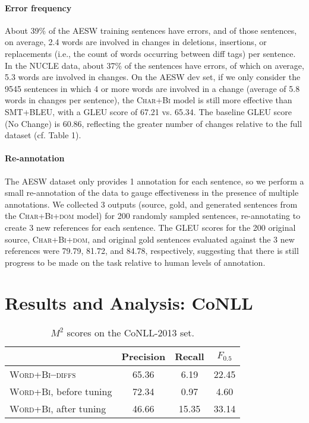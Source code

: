 \documentclass[11pt,letterpaper]{article}
\begin{document}
\paragraph{Error frequency} About 39\% of the AESW training sentences have errors, and of those sentences, on average, 2.4 words are involved in changes in deletions, insertions, or replacements (i.e., the count of words occurring between diff tags) per sentence. In the NUCLE data, about 37\% of the sentences have errors, of which on average, 5.3 words are involved in changes. On the AESW dev set, if we only consider the 9545 sentences in which 4 or more words are involved in a change (average of 5.8 words in changes per sentence), the \textsc{Char+Bi} model is still more effective than \textsc{SMT+BLEU}, with a GLEU score of 67.21 vs. 65.34. The baseline GLEU score (No Change) is 60.86, reflecting the greater number of changes relative to the full dataset (cf. Table 1).

\paragraph{Re-annotation}
The AESW dataset only provides 1 annotation for each sentence, so we perform a small re-annotation of the data to gauge effectiveness in the presence of multiple annotations. We collected 3 outputs (source, gold, and generated sentences from the \textsc{Char+Bi+dom} model) for 200 randomly sampled sentences, re-annotating to create 3 new references for each sentence. The GLEU scores for the 200 original source, \textsc{Char+Bi+dom}, and original gold sentences evaluated against the 3 new references were 79.79, 81.72, and 84.78, respectively, suggesting that there is still progress to be made on the task relative to human levels of annotation. 

\section{Results and Analysis: CoNLL}

\begin{table}
\centering
\small
\begin{tabular}{lccc}
\toprule
& Precision & Recall & $F_{0.5}$ \\
\midrule
\textsc{Word+Bi\textbf{--}diffs} & 65.36 & 6.19 & 22.45 \\
\textsc{Word+Bi}, before tuning & 72.34 & 0.97 & 4.60 \\ 
\textsc{Word+Bi}, after tuning & 46.66 & 15.35 & 33.14 \\ 
\bottomrule
\end{tabular}
\caption{\small{$M^2$ scores on the CoNLL-2013 set.}}
\label{table:conll-tuning}
\end{table}
\end{document}
